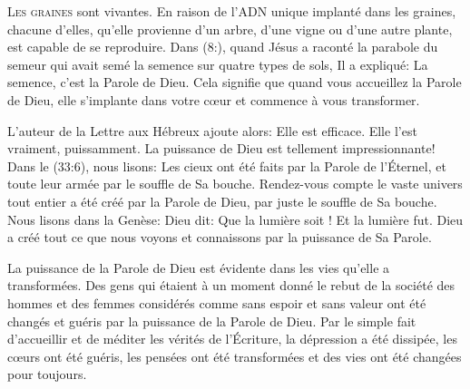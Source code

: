 



\lettrine{L}{es graines} sont vivantes.
 En raison de l'ADN unique implanté dans les graines, chacune d'elles,
 qu'elle provienne d'un arbre, d'une vigne ou d'une autre plante,
 est capable de se reproduire.
 Dans (8:), quand Jésus a raconté la parabole du semeur
 qui avait semé la semence sur quatre types de sols,
 Il a expliqué: 
 \Og La semence, c'est la Parole de Dieu. \Fg{}
 Cela signifie que quand vous accueillez la Parole de Dieu,
 elle s'implante dans votre c\oe{}ur et commence à vous transformer. 



L'auteur de la Lettre aux Hébreux ajoute alors: 
 \Og Elle est efficace. \Fg{} 
 Elle l'est vraiment, puissamment.
 La puissance de Dieu est tellement impressionnante!
 Dans le (33:6), nous lisons: 
 \Og Les cieux ont été faits par la Parole de l'Éternel,
 et toute leur armée par le souffle de Sa bouche. \Fg{}
 Rendez-vous compte \ocadr le vaste univers tout entier a été créé
 par la Parole de Dieu, par juste 
 le souffle de Sa bouche.
 Nous lisons dans la Genèse: 
 \Og Dieu dit: Que la lumière soit ! Et la lumière fut. \Fg{}
 Dieu a créé tout ce que nous voyons et connaissons
 par la puissance de Sa Parole. 

La puissance de la Parole de Dieu est évidente dans les vies
 qu'elle a transformées. Des gens qui étaient à un moment donné
 le rebut de la société \ocadr des hommes et des femmes considérés
 comme sans espoir et sans valeur \fcadr{} ont été changés et guéris
 par la puissance de la Parole de Dieu.
 Par le simple fait d'accueillir et de méditer les vérités de l'Écriture,
 la dépression a été dissipée, les c\oe{}urs ont été guéris,
 les pensées ont été transformées et des vies ont été changées
 \ocadr pour toujours. 

\dvrule



